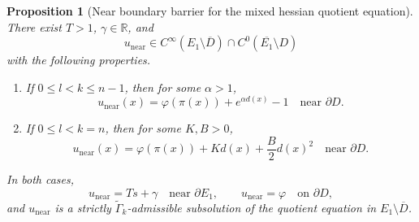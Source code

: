 \documentclass[reqno,a4paper]{amsart}
\numberwithin{equation}{section}
\newtheorem{proposition}{Proposition}[section]
\begin{document}
	\begin{proposition}[Near boundary barrier for the mixed hessian quotient equation]\label{near}
		There exist $T > 1$, $\gamma \in \mathbb{R}$, and 
		\[
		u_{\mathrm{near}} \in C^\infty(E_1 \setminus \overline{D}) \cap C^0(\overline{E_1} \setminus D)
		\]
		with the following properties.
		\begin{enumerate}
			\item[(i)] If $0 \le l < k \le n-1$, then for some $\alpha > 1$,
			\[
			u_{\mathrm{near}}(x) = \varphi(\pi(x)) + e^{\alpha d(x)} - 1 \quad \text{near } \partial D.
			\]
			\item[(ii)] If $0\leq l<k = n$, then for some $K, B > 0$,
			\[
			u_{\mathrm{near}}(x) = \varphi(\pi(x)) + K d(x) + \frac{B}{2} d(x)^2 \quad \text{near } \partial D.
			\]
		\end{enumerate}
		In both cases,
		\[
		u_{\mathrm{near}} = Ts + \gamma \quad \text{near } \partial E_1, \qquad
		u_{\mathrm{near}} = \varphi \quad \text{on } \partial D,
		\]
		and $u_{\mathrm{near}}$ is a strictly $\widetilde{\Gamma}_k$-admissible subsolution of the quotient equation in $E_1 \setminus \overline{D}$.
	\end{proposition}
	
\end{document}
